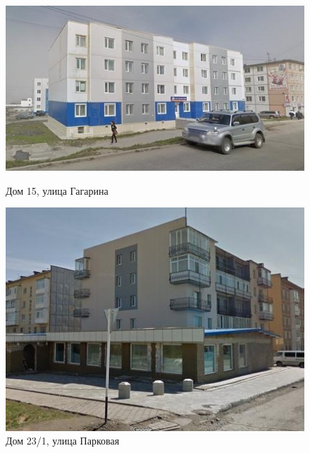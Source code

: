 \begin{figure}[H]
\begin{changemargin}{-1cm}{-1cm}
  \begin{center}
    \begin{minipage}[h]{0.545\linewidth}
        \includegraphics[width=1\textwidth]{authors/sydchak-fig-6.jpg}
        \caption{Дом 15, улица Гагарина }
        \label{fig:sydchak-fig-6}
    \end{minipage}
\hfill
    \begin{minipage}[h]{0.4\linewidth}
        \includegraphics[width=1\textwidth]{authors/sydchak-fig-7.jpg}
        \caption{Дом 23/1, улица Парковая }
        \label{fig:sydchak-fig-7}
    \end{minipage}


  \end{center}
\end{changemargin}

\end{figure}
